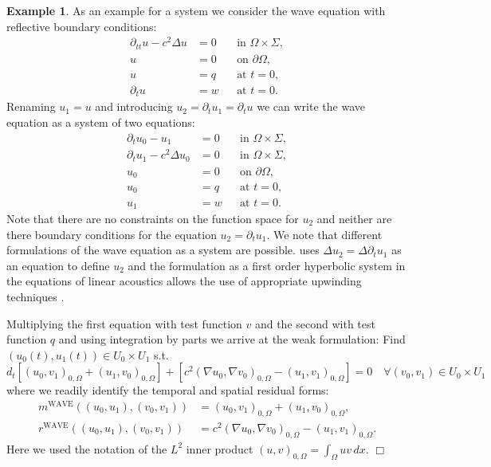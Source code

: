 \documentclass[a4paper,12pt]{article}
\theoremstyle{definition}
\newtheorem{exm}{Example}
\begin{document}
\begin{exm} \label{Exm:WaveEquation}
As an example for a system we consider the wave equation with reflective boundary conditions:
\begin{align*}
\partial_{tt} u-c^2\Delta u  &= 0 &&\text{in $\Omega\times\Sigma$},\\
u &= 0 &&\text{on $\partial\Omega$},\\
u &= q &&\text{at $t=0$},\\
\partial_t u &= w &&\text{at $t=0$}.
\end{align*}
Renaming $u_1=u$ and introducing $u_2=\partial_t u_1 =\partial_t u$ we can write the wave equation 
as a system of two equations:
\begin{align*}
\partial_t u_0 - u_1 &=0 &&\text{in $\Omega\times\Sigma$},\\
\partial_t u_1 - c^2\Delta u_0 &=0 &&\text{in $\Omega\times\Sigma$},\\
u_0 &= 0 &&\text{on $\partial\Omega$},\\
u_0 &= q &&\text{at $t=0$},\\
u_1 &= w &&\text{at $t=0$}.
\end{align*}
Note that there are no constraints on the function space for $u_2$
and neither are there boundary conditions for the equation $u_2=\partial_t u_1$.
We note that different formulations of the wave equation as a system are
possible. \cite{Eriksson} uses $\Delta u_2 = \Delta \partial_t u_1$ as 
an equation to define $u_2$ and the formulation as a first order hyperbolic
system in the equations of linear acoustics allows the use of appropriate
upwinding techniques \cite{LeVeque}. 

Multiplying the first equation with test function $v$ and the second with test function $q$
and using integration by parts we arrive at the weak formulation: Find $(u_0(t),u_1(t))\in
U_0\times U_1$ s.t.
\begin{equation*}
d_t \left[ (u_0,v_1)_{0,\Omega} + (u_1,v_0)_{0,\Omega}\right]
+ \left[ c^2 (\nabla u_0,\nabla v_0)_{0,\Omega} -(u_1,v_1)_{0,\Omega} \right] = 0 
\quad \forall (v_0,v_1)\in U_0\times U_1
\end{equation*}
where we readily identify the temporal and spatial residual forms:
\begin{align*}
m^{\text{WAVE}}((u_0,u_1),(v_0,v_1)) &= (u_0,v_1)_{0,\Omega} + (u_1,v_0)_{0,\Omega},\\
r^{\text{WAVE}}((u_0,u_1),(v_0,v_1)) &= c^2 (\nabla u_0,\nabla v_0)_{0,\Omega} - (u_1,v_1)_{0,\Omega} .
\end{align*}
Here we used the notation of the $L^2$ inner product $(u,v)_{0,\Omega} = \int_\Omega
u v \, dx$.
\hfill$\Box$
\end{exm}
\end{document}

